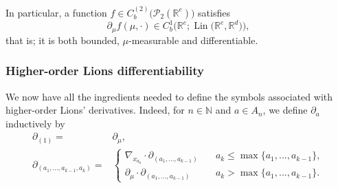 \documentclass[a4paper,11pt,twoside]{article}
\numberwithin{equation}{section}
\theoremstyle{plain}
\newcommand{\bN}{\mathbb{N}}
\newcommand{\bR}{\mathbb{R}}
\newcommand{\cP}{\mathcal{P}}
\DeclareMathOperator{\lin}{Lin}
\newcommand{\1}{\mathbbm{1}}
\begin{document}
	In particular, a function $f\in C^{(2)}_b\big( \cP_2(\bR^e) \big)$ satisfies
	$$
	\partial_\mu f(\mu, \cdot)\in C_b^1\Big(\bR^e; \lin\big( \bR^e, \bR^d\big) \Big), 
	$$
	that is; it is both bounded, $\mu$-measurable and differentiable.  
	
	\subsubsection*{Higher-order Lions differentiability}
	
	We now have all the ingredients needed to define the symbols associated with higher-order Lions' derivatives. Indeed, for $n\in \bN$ and $a\in A_n$, we define $\partial_a$ inductively by
	\begin{align*}
		\partial_{(1)} =& \partial_\mu, 
		\\
		\partial_{(a_1, ..., a_{k-1}, a_k)} =&
		\begin{cases} 
			\nabla_{x_{a_k}} \cdot \partial_{(a_1, ..., a_{k-1})} & \quad a_k \leq \max \{a_1, ..., a_{k-1}\}, 
			\\
			\partial_\mu \cdot \partial_{(a_1, ..., a_{k-1})} & \quad a_k > \max \{a_1, ..., a_{k-1}\}. 
		\end{cases}
	\end{align*}
	
\end{document}
